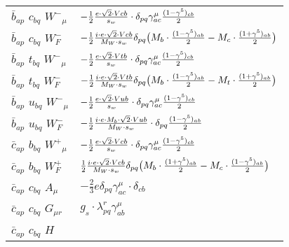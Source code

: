 \begin{center}
\begin{tabular}{|l|l|}
$\bar{b}{}_{a p }$ \phantom{-} $c{}_{b q }$ \phantom{-} $W^-{}_{\mu }$ \phantom{-}  &
	$-\frac{1}{2}\frac{ e \cdot\sqrt{2} \cdot Vcb}{ s_w}\cdot \delta_{p q} \gamma_{a c}^\mu {(1-\gamma^5)_{c b}\over 2} $\\[2mm]
$\bar{b}{}_{a p }$ \phantom{-} $c{}_{b q }$ \phantom{-} $W^-_F{}_{}$ \phantom{-}  &
	$-\frac{1}{2}\frac{ i \cdot e \cdot\sqrt{2} \cdot Vcb}{ M_W \cdot s_w}\delta_{p q} \big( M_b\cdot {(1-\gamma^5)_{a b}\over 2} - M_c\cdot {(1+\gamma^5)_{a b}\over 2} \big)$\\[2mm]
$\bar{b}{}_{a p }$ \phantom{-} $t{}_{b q }$ \phantom{-} $W^-{}_{\mu }$ \phantom{-}  &
	$-\frac{1}{2}\frac{ e \cdot\sqrt{2} \cdot Vtb}{ s_w}\cdot \delta_{p q} \gamma_{a c}^\mu {(1-\gamma^5)_{c b}\over 2} $\\[2mm]
$\bar{b}{}_{a p }$ \phantom{-} $t{}_{b q }$ \phantom{-} $W^-_F{}_{}$ \phantom{-}  &
	$-\frac{1}{2}\frac{ i \cdot e \cdot\sqrt{2} \cdot Vtb}{ M_W \cdot s_w}\delta_{p q} \big( M_b\cdot {(1-\gamma^5)_{a b}\over 2} - M_t\cdot {(1+\gamma^5)_{a b}\over 2} \big)$\\[2mm]
$\bar{b}{}_{a p }$ \phantom{-} $u{}_{b q }$ \phantom{-} $W^-{}_{\mu }$ \phantom{-}  &
	$-\frac{1}{2}\frac{ e \cdot\sqrt{2} \cdot Vub}{ s_w}\cdot \delta_{p q} \gamma_{a c}^\mu {(1-\gamma^5)_{c b}\over 2} $\\[2mm]
$\bar{b}{}_{a p }$ \phantom{-} $u{}_{b q }$ \phantom{-} $W^-_F{}_{}$ \phantom{-}  &
	$-\frac{1}{2}\frac{ i \cdot e \cdot M_b \cdot\sqrt{2} \cdot Vub}{ M_W \cdot s_w}\cdot \delta_{p q} {(1-\gamma^5)_{a b}\over 2} $\\[2mm]
$\bar{c}{}_{a p }$ \phantom{-} $b{}_{b q }$ \phantom{-} $W^+{}_{\mu }$ \phantom{-}  &
	$-\frac{1}{2}\frac{ e \cdot\sqrt{2} \cdot Vcb}{ s_w}\cdot \delta_{p q} \gamma_{a c}^\mu {(1-\gamma^5)_{c b}\over 2} $\\[2mm]
$\bar{c}{}_{a p }$ \phantom{-} $b{}_{b q }$ \phantom{-} $W^+_F{}_{}$ \phantom{-}  &
	$\frac{1}{2}\frac{ i \cdot e \cdot\sqrt{2} \cdot Vcb}{ M_W \cdot s_w}\delta_{p q} \big( M_b\cdot {(1+\gamma^5)_{a b}\over 2} - M_c\cdot {(1-\gamma^5)_{a b}\over 2} \big)$\\[2mm]
$\bar{c}{}_{a p }$ \phantom{-} $c{}_{b q }$ \phantom{-} ${A}_{\mu }$ \phantom{-}  &
	$-\frac{2}{3} e\delta_{p q} \gamma_{a c}^\mu \cdot \delta_{c b} $\\[2mm]
$\bar{c}{}_{a p }$ \phantom{-} $c{}_{b q }$ \phantom{-} ${G}_{\mu r }$ \phantom{-}  &
	$ g_s\cdot \lambda_{p q}^r \gamma_{a b}^\mu $\\[2mm]
$\bar{c}{}_{a p }$ \phantom{-} $c{}_{b q }$ \phantom{-} ${H}_{}$ \phantom{-}  &

\end{tabular}
\end{center}
